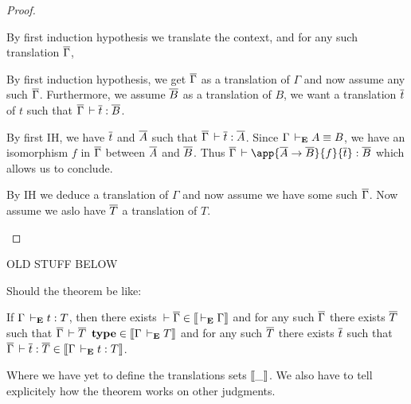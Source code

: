 \begin{proof}
\begin{caselist}
    \nextcase
    \begin{mathpar}
    \end{mathpar}
    By first induction hypothesis we translate the context, and for any such
    translation $\barG$, 

    \nextcase
    \begin{mathpar}
    \end{mathpar}
    By first induction hypothesis, we get $\barG$ as a translation of $\Gamma$
    and now assume any such $\barG$. Furthermore, we assume $\barB$ as a
    translation of $B$, we want a translation $\bart$ of $t$ such that
    $\barG \der \bart : \barB$.

    By first IH, we have $\bart$ and $\barA$ such that
    $\barG \der \bart : \barA$. Since $\Gamma \dere A \equiv B$, we have
    an isomorphism $f$ in $\barG$ between $\barA$ and $\barB$.
    Thus $\barG \der \app{\barA \to \barB}{f}{\bart} : \barB$ which allows us
    to conclude.

    \nextcase
    \begin{mathpar}
    \end{mathpar}
    By IH we deduce a translation of $\Gamma$ and now assume we have some such
    $\barG$. Now assume we aslo have $\barT$ a translation of $T$.

    \nextcase
    \begin{mathpar}
    \end{mathpar}
  \end{caselist}
\end{proof}

\newpage
\hrulefill
OLD STUFF BELOW

Should the theorem be like:

\begin{theorem}
  If $\Gamma \dere t : T$, then there exists
  $\der \barG \in \den{\dere \Gamma}$ and for any such $\barG$ there exists
  $\barT$ such that $\barG \der \barT\ \type \in \den{\Gamma \dere T}$
  and for any such $\barT$ there exists $\bart$ such that
  $\barG \der \bart : \barT \in \den{\Gamma \dere t : T}$.
\end{theorem}
%
Where we have yet to define the translations sets $\den{\_}$.
We also have to tell explicitely how the theorem works on other judgments.

